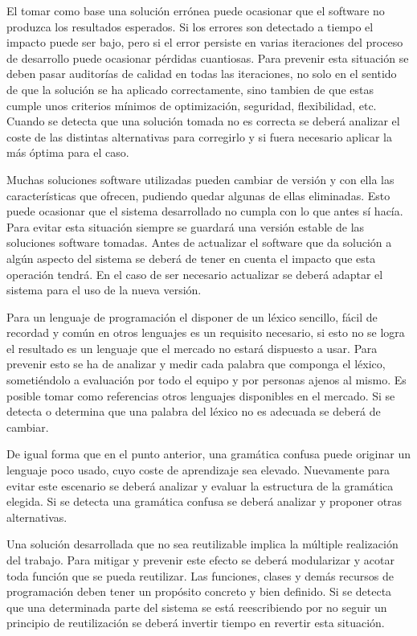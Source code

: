 El tomar como base una solución errónea puede ocasionar que el software no produzca los resultados esperados. Si los errores son detectado a tiempo 
el impacto puede ser bajo, pero si el error persiste en varias iteraciones del proceso de desarrollo puede ocasionar pérdidas cuantiosas. Para 
prevenir esta situación se deben pasar auditorías de calidad en todas las iteraciones, no solo en el sentido de que la solución 
se ha aplicado correctamente, sino tambien de que estas cumple unos criterios mínimos de optimización, seguridad, flexibilidad, etc. Cuando se detecta
que una solución tomada no es correcta se deberá analizar el coste de las distintas alternativas para corregirlo y si fuera necesario aplicar la más óptima para 
el caso.

Muchas soluciones software utilizadas pueden cambiar de versión y con ella las características que ofrecen, pudiendo quedar algunas de ellas eliminadas. Esto 
puede ocasionar que el sistema desarrollado no cumpla con lo que antes sí hacía. Para evitar esta situación siempre se guardará una versión estable de las 
soluciones software tomadas. Antes de actualizar el software que da solución a algún aspecto del sistema se deberá de tener en cuenta el impacto que esta operación 
tendrá. En el caso de ser necesario actualizar se deberá adaptar el sistema para el uso de la nueva versión. 

Para un lenguaje de programación el disponer de un léxico sencillo, fácil de recordad y común en otros lenguajes es un requisito necesario, si esto no se logra 
el resultado es un lenguaje que el mercado no estará dispuesto a usar. Para prevenir esto se ha de analizar y medir cada palabra que componga el léxico, sometiéndolo 
a evaluación por todo el equipo y por personas ajenos al mismo. Es posible tomar como referencias otros lenguajes disponibles en el mercado. 
Si se detecta o determina que una palabra del léxico no es adecuada se deberá de cambiar. 

De igual forma que en el punto anterior, una gramática confusa puede originar un lenguaje poco usado, cuyo coste de aprendizaje sea elevado. Nuevamente para evitar este
escenario se deberá analizar y evaluar la estructura de la gramática elegida. Si se detecta una gramática confusa se deberá analizar y proponer otras alternativas.

Una solución desarrollada que no sea reutilizable implica la múltiple realización del trabajo. Para mitigar y prevenir este efecto se deberá modularizar y acotar toda 
función que se pueda reutilizar. Las funciones, clases y demás recursos de programación deben tener un propósito concreto y bien definido. Si se detecta que una determinada parte del 
sistema se está reescribiendo por no seguir un principio de reutilización se deberá invertir tiempo en revertir esta situación.

